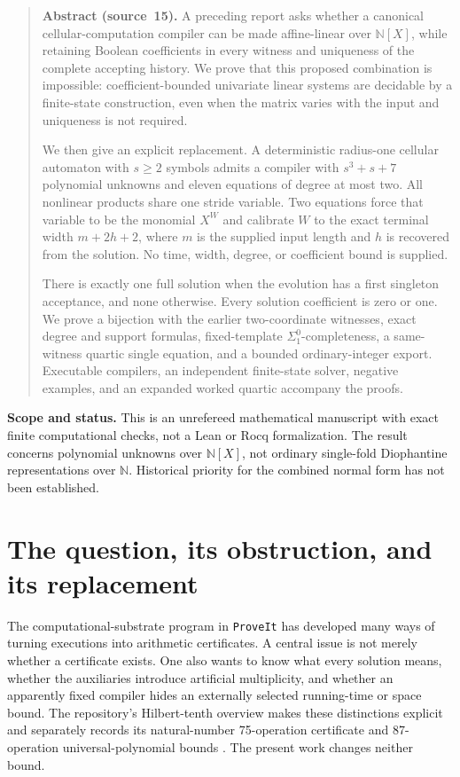 \documentclass[11pt,letterpaper]{article}
\numberwithin{equation}{section}
\theoremstyle{definition}
\newcommand{\N}{\mathbb N}
\newcommand{\code}[1]{\texttt{\small #1}}
\begin{document}
\begin{quote}\small
\textbf{Abstract (source~15).}
A preceding report asks whether a canonical cellular-computation compiler
can be made affine-linear over $\N[X]$, while retaining Boolean coefficients
in every witness and uniqueness of the complete accepting history. We prove
that this proposed combination is impossible: coefficient-bounded univariate
linear systems are decidable by a finite-state construction, even when the
matrix varies with the input and uniqueness is not required.

We then give an explicit replacement. A deterministic radius-one cellular
automaton with $s\ge2$ symbols admits a compiler with $s^3+s+7$ polynomial
unknowns and eleven equations of degree at most two. All nonlinear products
share one stride variable. Two equations force that variable to be the
monomial $X^W$ and calibrate $W$ to the exact terminal width
$m+2h+2$, where $m$ is the supplied input length and $h$ is recovered from
the solution. No time, width, degree, or coefficient bound is supplied.

There is exactly one full solution when the evolution has a first singleton
acceptance, and none otherwise. Every solution coefficient is zero or one.
We prove a bijection with the earlier two-coordinate witnesses, exact degree
and support formulas, fixed-template $\Sigma^0_1$-completeness, a same-witness
quartic single equation, and a bounded ordinary-integer export. Executable
compilers, an independent finite-state solver, negative examples, and an
expanded worked quartic accompany the proofs.
\end{quote}

\begin{statementbox}
\textbf{Scope and status.} This is an unrefereed mathematical manuscript with
exact finite computational checks, not a Lean or Rocq formalization.
The result concerns polynomial unknowns over $\N[X]$, not ordinary
single-fold Diophantine representations over $\N$. Historical priority for
the combined normal form has not been established.
\end{statementbox}

\section{The question, its obstruction, and its replacement}
\label{pwh:oc:sec:intro}

The computational-substrate program in \code{ProveIt} has developed many
ways of turning executions into arithmetic certificates. A central issue is
not merely whether a certificate exists. One also wants to know what every
solution means, whether the auxiliaries introduce artificial multiplicity,
and whether an apparently fixed compiler hides an externally selected
running-time or space bound. The repository's Hilbert-tenth overview makes
these distinctions explicit and separately records its natural-number
75-operation certificate and 87-operation universal-polynomial bounds
\cite{oc:ProveIt}. The present work changes neither bound.
\end{document}
